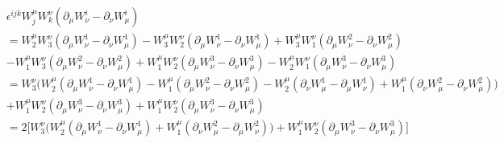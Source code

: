 \documentclass[11pt]{article}
\begin{document}
\begin{align*}
& \epsilon^{ijk} W^{\mu}_j W^{\nu}_k(\partial_{\mu} W_{\nu}^i 
- \partial_{\nu} W_{\mu}^i)\\
&= W^{\mu}_2 W^{\nu}_3(\partial_{\mu} W_{\nu}^1 
- \partial_{\nu} W_{\mu}^1)
- W^{\mu}_3 W^{\nu}_2(\partial_{\mu} W_{\nu}^1 
- \partial_{\nu} W_{\mu}^1)
+ W^{\mu}_3 W^{\nu}_1(\partial_{\mu} W_{\nu}^2 
- \partial_{\nu} W_{\mu}^2)\\
&- W^{\mu}_1 W^{\nu}_3(\partial_{\mu} W_{\nu}^2 
- \partial_{\nu} W_{\mu}^2)
+ W^{\mu}_1 W^{\nu}_2(\partial_{\mu} W_{\nu}^3 
- \partial_{\nu} W_{\mu}^3)
- W^{\mu}_2 W^{\nu}_1(\partial_{\mu} W_{\nu}^3 
- \partial_{\nu} W_{\mu}^3)\\
&= W^{\nu}_3 \big( W^{\mu}_2 (\partial_{\mu} W_{\nu}^1 
- \partial_{\nu} W_{\mu}^1)
- W^{\mu}_1 (\partial_{\mu} W_{\nu}^2 
- \partial_{\nu} W_{\mu}^2)
-  W^{\mu}_2(\partial_{\nu} W_{\mu}^1 
- \partial_{\mu} W_{\nu}^1)
+ W^{\mu}_1(\partial_{\nu} W_{\mu}^2 
- \partial_{\nu} W_{\mu}^2) \big)\\
&+ W^{\mu}_1 W^{\nu}_2(\partial_{\mu} W_{\nu}^3 
- \partial_{\nu} W_{\mu}^3)
+ W^{\mu}_1 W^{\nu}_2 (\partial_{\mu} W_{\nu}^3- \partial_{\nu} W_{\mu}^3 )\\
&= 2 \Big[ W^{\nu}_3 \big( W^{\mu}_2 (\partial_{\mu} W_{\nu}^1 
- \partial_{\nu} W_{\mu}^1)
+ W^{\mu}_1 (\partial_{\nu} W_{\mu}^2 -\partial_{\mu} W_{\nu}^2 ) \big)
+ W^{\mu}_1 W^{\nu}_2(\partial_{\mu} W_{\nu}^3 
- \partial_{\nu} W_{\mu}^3) \Big]\\
\end{align*}
\end{document}
